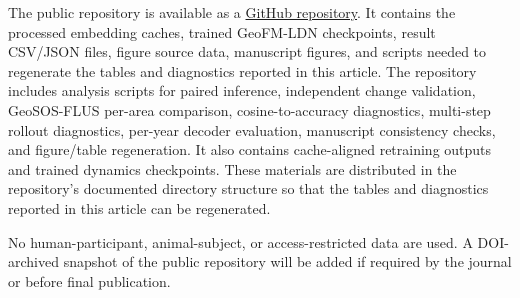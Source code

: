 \documentclass{article}
\begin{document}
The public repository is available as a \href{https://github.com/zhouning/paper58-geofm-world-model-rl}{GitHub repository}. It contains the processed embedding caches, trained GeoFM-LDN checkpoints, result CSV/JSON files, figure source data, manuscript figures, and scripts needed to regenerate the tables and diagnostics reported in this article. The repository includes analysis scripts for paired inference, independent change validation, GeoSOS-FLUS per-area comparison, cosine-to-accuracy diagnostics, multi-step rollout diagnostics, per-year decoder evaluation, manuscript consistency checks, and figure/table regeneration. It also contains cache-aligned retraining outputs and trained dynamics checkpoints. These materials are distributed in the repository's documented directory structure so that the tables and diagnostics reported in this article can be regenerated.

No human-participant, animal-subject, or access-restricted data are used. A DOI-archived snapshot of the public repository will be added if required by the journal or before final publication.
\end{document}

